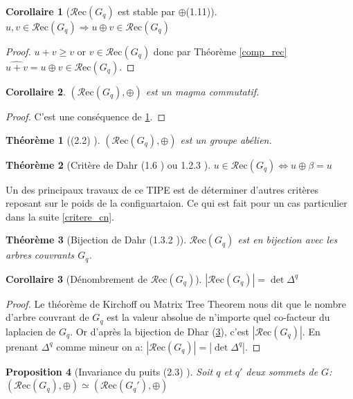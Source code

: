\documentclass{report}
\newtheorem{theorem}{Théorème}[chapter]
\newtheorem{property}[theorem]{Proposition}
\newtheorem{corollary}{Corollaire}[theorem]
\newcommand{\recu}[1]{\ensuremath{\mathcal{R}\text{ec}(#1)}}
\newcommand{\stab}[1]{\ensuremath{\widehat{#1}}}
\newcommand{\plus}{\ensuremath{\oplus}}
\newcommand{\card}[1]{\ensuremath{|#1|}}
\begin{document}
\begin{corollary}[\recu{G_q} est stable par \plus (1.11)] \label{lci}
$ u, v \in \recu{G_q} \Rightarrow u \plus v \in \recu{G_q} $
\end{corollary}
\begin{proof}
$u + v \geq v$ or $v \in \recu{G_q}$ donc par Théorème \ref{comp_rec} $\stab{u + v} = u \plus{} v \in \recu{G_q}$.
\end{proof}

\begin{corollary}
$(\recu{G_q}, \plus)$ est un magma commutatif.
\end{corollary}
\begin{proof}
C'est une conséquence de \ref{lci}.
\end{proof}

\begin{theorem}[(2.2) \cite{thPoly}]
$(\recu{G_q}, \plus)$ est un groupe abélien.
\end{theorem}

\begin{theorem}[Critère de Dahr (1.6 \cite{thPoly}) ou 1.2.3 \cite{thBordeaux}]\label{crit_dahr}
$u \in \recu{G_q} \Leftrightarrow u \plus \beta = u$
\end{theorem}

Un des principaux travaux de ce TIPE est de déterminer d'autres critères reposant sur le poids de la configuartaion. Ce qui est fait pour un cas particulier dans la suite \ref{critere_cn}.


\begin{theorem}[Bijection de Dahr (1.3.2 \cite{thPoly})] \label{bij_dahr}
\recu{G_q} est en bijection avec les arbres couvrants $G_q$.
\end{theorem}

\begin{corollary}[Dénombrement de \recu{G_q}] \label{group_order}
$\card{\recu{G_q}} = \det \Delta^q$
\end{corollary}
\begin{proof}
Le théorème de Kirchoff ou Matrix Tree Theorem nous dit que le nombre d'arbre couvrant de $G_q$ est la valeur absolue de n'importe quel co-facteur du laplacien de $G_q$. Or d'après la bijection de Dhar (\ref{bij_dahr}), c'est $\card{\recu{G_q}}$. En prenant $\Delta^q$ comme mineur on a: $\card{\recu{G_q}} = |\det \Delta^q|$.
\end{proof}

\begin{property}[Invariance du puits (2.3) \cite{thPoly}]\label{inv_puits}
Soit $q$ et $q'$ deux sommets de $G$: $(\recu{G_q}, \plus) \simeq (\recu{G_q'}, \plus)$
\end{property}
\end{document}
